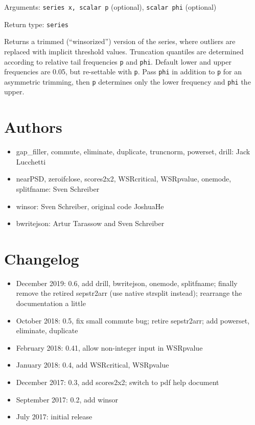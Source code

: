 \documentclass[11pt,english]{article}
\begin{document}
Arguments: \texttt{series x, scalar p} (optional), \texttt{scalar
phi} (optional) 

\noindent Return type: \texttt{series}

Returns a trimmed (``winsorized'') version
of the series, where outliers are replaced with implicit threshold
values. Truncation quantiles are determined according to relative
tail frequencies \texttt{p} and \texttt{phi}. Default lower and upper
frequencies are 0.05, but re-settable with \texttt{p}. Pass \texttt{phi}
in addition to \texttt{p} for an asymmetric trimming, then \texttt{p}
determines only the lower frequency and \texttt{phi} the upper. 

\section{Authors}
\begin{itemize}
\item gap\_filler, commute, eliminate, duplicate, truncnorm, powerset, drill:
 Jack Lucchetti

\item nearPSD, zeroifclose, scores2x2, WSRcritical, WSRpvalue, onemode,
splitfname:
Sven Schreiber 

\item winsor: Sven Schreiber, original code JoshuaHe
\item bwritejson: Artur Tarassow and Sven Schreiber

\end{itemize}

\section{Changelog }
\begin{itemize}
\item December 2019: 0.6, add drill, bwritejson, onemode, splitfname; 
    finally remove the retired sepstr2arr (use native strsplit instead);
    rearrange the documentation a little
\item October 2018: 0.5, fix small commute bug; retire sepstr2arr; add powerset,
  eliminate, duplicate
\item February 2018: 0.41, allow non-integer input in WSRpvalue
\item January 2018: 0.4, add WSRcritical, WSRpvalue
\item December 2017: 0.3, add scores2x2; switch to pdf help document
\item September 2017: 0.2, add winsor 
\item July 2017: initial release
\end{itemize}
\end{document}

